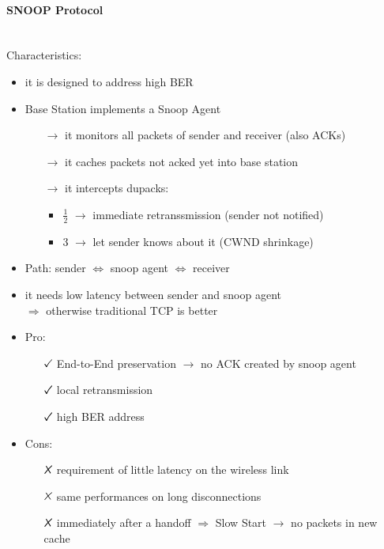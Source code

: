 \paragraph{SNOOP Protocol} \mbox{}\\[0.2cm]
Characteristics:
\begin{itemize}
    \item it is designed to address high BER
    \item Base Station implements a Snoop Agent
    \begin{itemize}
        \item[$\rightarrow$] it monitors all packets of sender and receiver (also ACKs)
        \item[$\rightarrow$] it caches packets not acked yet into base station
        \item[$\rightarrow$] it intercepts dupacks:
        \begin{itemize}
            \item $\frac{1}{2}$ $\rightarrow$ immediate retranssmission (sender not notified)
            \item 3 $\rightarrow$ let sender knows about it (CWND shrinkage)
        \end{itemize}
    \end{itemize}
    \item Path: sender $\Leftrightarrow$ snoop agent $\Leftrightarrow$ receiver
    \item it needs low latency between sender and snoop agent\\$\Rightarrow$
    otherwise traditional TCP is better
    \item Pro:
    \begin{itemize}
        \item[$\tikzcmark$] End-to-End preservation $\rightarrow$ no ACK created by snoop agent
        \item[$\tikzcmark$] local retransmission
        \item[$\tikzcmark$] high BER address 
    \end{itemize}
    \item Cons:
    \begin{itemize}
        \item[$\tikzxmark$] requirement of little latency on the wireless link
        \item[$\tikzxmark$] same performances on long disconnections
        \item[$\tikzxmark$] immediately after a handoff $\Rightarrow$ Slow Start $\rightarrow$
        no packets in new cache
    \end{itemize}
\end{itemize}

